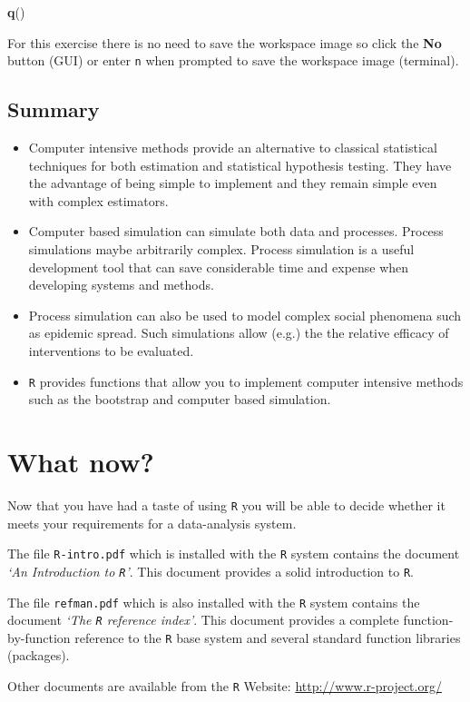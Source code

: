 \documentclass[12pt,a4paper]{book}
\newenvironment{Shaded}{\begin{snugshade}}{\end{snugshade}}
\newcommand{\KeywordTok}[1]{\textcolor[rgb]{0.13,0.29,0.53}{\textbf{#1}}}
\newcommand{\NormalTok}[1]{#1}
\theoremstyle{definition}
\theoremstyle{definition}
\theoremstyle{definition}
\theoremstyle{remark}
\begin{document}
\begin{Shaded}
\begin{Highlighting}[]
\KeywordTok{q}\NormalTok{()}
\end{Highlighting}
\end{Shaded}

For this exercise there is no need to save the workspace image so click
the \textbf{No} button (GUI) or enter \texttt{n} when prompted to save
the workspace image (terminal).

\hypertarget{summary-8}{%
\section{Summary}\label{summary-8}}

\begin{itemize}
\item
  Computer intensive methods provide an alternative to classical
  statistical techniques for both estimation and statistical hypothesis
  testing. They have the advantage of being simple to implement and they
  remain simple even with complex estimators.
\item
  Computer based simulation can simulate both data and processes.
  Process simulations maybe arbitrarily complex. Process simulation is a
  useful development tool that can save considerable time and expense
  when developing systems and methods.
\item
  Process simulation can also be used to model complex social phenomena
  such as epidemic spread. Such simulations allow (e.g.) the the
  relative efficacy of interventions to be evaluated.
\item
  \texttt{R} provides functions that allow you to implement computer
  intensive methods such as the bootstrap and computer based simulation.
\end{itemize}

\hypertarget{what-now}{%
\chapter*{What now?}\label{what-now}}

Now that you have had a taste of using \texttt{R} you will be able to
decide whether it meets your requirements for a data-analysis system.

The file \texttt{R-intro.pdf} which is installed with the \texttt{R}
system contains the document \emph{`An Introduction to \texttt{R}'}.
This document provides a solid introduction to \texttt{R}.

The file \texttt{refman.pdf} which is also installed with the \texttt{R}
system contains the document \emph{`The \texttt{R} reference index'}.
This document provides a complete function-by-function reference to the
\texttt{R} base system and several standard function libraries
(packages).

Other documents are available from the \texttt{R} Website:
\url{http://www.r-project.org/}


\end{document}
